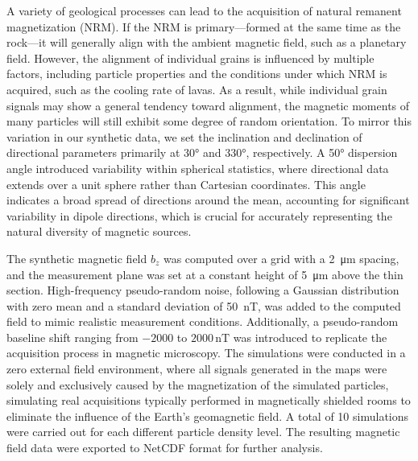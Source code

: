 A variety of geological processes can lead to the acquisition of natural remanent magnetization (NRM). If the NRM is primary—formed at the same time as the rock—it will generally align with the ambient magnetic field, such as a planetary field. However, the alignment of individual grains is influenced by multiple factors, including particle properties \citep[shape, size, domain state,][]{Bellon2025} and the conditions under which NRM is acquired, such as the cooling rate of lavas. As a result, while individual grain signals may show a general tendency toward alignment, the magnetic moments of many particles will still exhibit some degree of random orientation. To mirror this variation in our synthetic data, we set the inclination and declination of directional parameters primarily at 30° and 330°, respectively. A 50° dispersion angle introduced variability within spherical statistics, where directional data extends over a unit sphere rather than Cartesian coordinates. This angle indicates a broad spread of directions around the mean, accounting for significant variability in dipole directions, which is crucial for accurately representing the natural diversity of magnetic sources.

The synthetic magnetic field \(b_z\) was computed over a grid with a \qty{2}{\um} spacing, and the measurement plane was set at a constant height of \qty{5}{\um} above the thin section. High-frequency pseudo-random noise, following a Gaussian distribution with zero mean and a standard deviation of \qty{50}{\nano\tesla}, was added to the computed field to mimic realistic measurement conditions. Additionally, a pseudo-random baseline shift ranging from \(-2000\) to \(2000\,\mathrm{nT}\) was introduced to replicate the acquisition process in magnetic microscopy. The simulations were conducted in a zero external field environment, where all signals generated in the maps were solely and exclusively caused by the magnetization of the simulated particles, simulating real acquisitions typically performed in magnetically shielded rooms to eliminate the influence of the Earth's geomagnetic field. A total of 10 simulations were carried out for each different particle density level. The resulting magnetic field data were exported to NetCDF format for further analysis.


